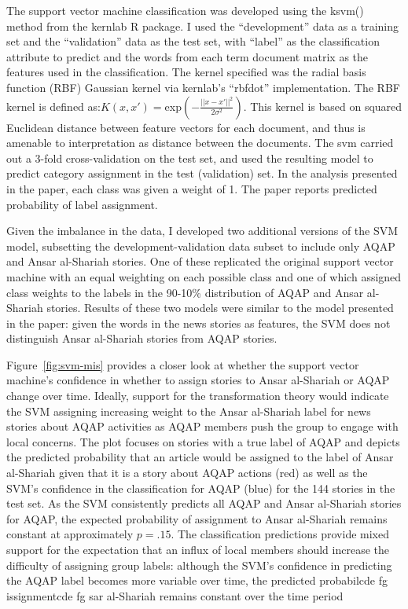 The support vector machine classification was developed using the
ksvm() method from the kernlab R package. I used the ``development''
data as a training set and the ``validation'' data as the test set,
with ``label'' as the classification attribute to predict and the
words from each term document matrix as the features used in the
classification.
The kernel specified was the radial basis function (RBF) Gaussian
kernel via kernlab's ``rbfdot'' implementation. The RBF kernel is
defined as:$K(x,x\prime)=$exp$(-\frac{||x-x\prime||^{2}}{2\sigma^{2}})$. This
kernel is based on squared Euclidean distance between feature vectors
for each document, and thus is amenable to interpretation as distance
between the documents. The svm carried out a 3-fold cross-validation
on the test set, and used the resulting model to predict category
assignment in the test (validation) set. In the analysis presented in
the paper, each class was given a weight of 1.  The paper reports
predicted probability of label assignment.

Given the imbalance in the data, I developed two additional versions of
the SVM model, subsetting the  development-validation data subset to include only AQAP and Ansar al-Shariah stories. One of these replicated the
original support vector machine with an equal weighting on each
possible class and one of which assigned class weights to the
labels in the 90-10\% distribution of AQAP and Ansar al-Shariah
stories.  Results of these two models were similar to the model
presented in the paper: given the words in
the news stories as features, the SVM does not distinguish Ansar
al-Shariah stories from AQAP stories.

Figure~\ref{fig:svm-mis} provides a closer look at whether the
support vector machine's confidence in whether to assign stories to
Ansar al-Shariah or AQAP change over time. Ideally, support for the
transformation theory would indicate the SVM assigning increasing weight to the Ansar
al-Shariah label for news stories about AQAP activities as AQAP
members push the group to engage with local concerns.  The plot
focuses on stories with a true label of AQAP and depicts the predicted
probability that an article would be assigned to the label of Ansar
al-Shariah given that it is a story about AQAP actions (red) as well as the
SVM's confidence in the classification for AQAP (blue) for the 144
stories in the test set. As the SVM consistently predicts all AQAP and
Ansar al-Shariah stories for AQAP, the expected probability of
assignment to Ansar al-Shariah remains constant at approximately
$p=.15$. The classification predictions provide mixed support for the
expectation that an influx of local members should increase the
difficulty of assigning group labels: although the SVM's confidence in
predicting the AQAP label becomes more variable over time, the
predicted probabilcde fg
issignmentcde fg
sar al-Shariah remains
constant over the time period

